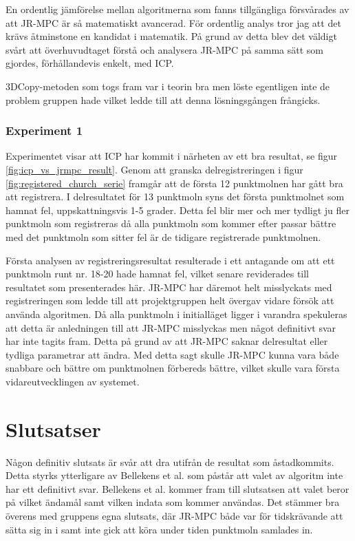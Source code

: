 En ordentlig jämförelse mellan algoritmerna som fanns tillgängliga försvårades av att JR-MPC är så matematiskt avancerad. För ordentlig analys tror jag att det krävs åtminstone en kandidat i matematik. På grund av detta blev det väldigt svårt att överhuvudtaget förstå och analysera JR-MPC på samma sätt som gjordes, förhållandevis enkelt, med ICP. 

3DCopy-metoden som togs fram var i teorin bra men löste egentligen inte de problem gruppen hade vilket ledde till att denna lösningsgången frångicks. 

\subsubsection{Experiment 1}

Experimentet visar att ICP har kommit i närheten av ett bra resultat, se figur \ref{fig:icp_vs_jrmpc_result}. Genom att granska delregistreringen i figur \ref{fig:registered_church_serie} framgår att de första 12 punktmolnen har gått bra att registrera. I delresultatet för 13 punktmoln syns det första punktmolnet som hamnat fel, uppskattningsvis 1-5 grader. Detta fel blir mer och mer tydligt ju fler punktmoln som registreras då alla punktmoln som kommer efter passar bättre med det punktmoln som sitter fel är de tidigare registrerade punktmolnen. 

Första analysen av registreringsresultat resulterade i ett antagande om att ett punktmoln runt nr. 18-20 hade hamnat fel, vilket senare reviderades till resultatet som presenterades här. JR-MPC har däremot helt misslyckats med registreringen som ledde till att projektgruppen helt övergav vidare försök att använda algoritmen. Då alla punktmoln i initialläget ligger i varandra spekuleras att detta är anledningen till att JR-MPC misslyckas men något definitivt svar har inte tagits fram. Detta på grund av att JR-MPC saknar delresultat eller tydliga parametrar att ändra. Med detta sagt skulle JR-MPC kunna vara både snabbare och bättre om punktmolnen förbereds bättre, vilket skulle vara första vidareutvecklingen av systemet.

\section{Slutsatser}
\label{sec:conclusions-karlsson}

Någon definitiv slutsats är svår att dra utifrån de resultat som åstadkommits. Detta styrks ytterligare av Bellekens et al. \cite{registration_comparing} som påstår att valet av algoritm inte har ett definitivt svar. Bellekens et al. kommer fram till slutsatsen att valet beror på vilket ändamål samt vilken indata som kommer användas. Det stämmer bra överens med gruppens egna slutsats, där JR-MPC både var för tidskrävande att sätta sig in i samt inte gick att köra under tiden punktmoln samlades in.

